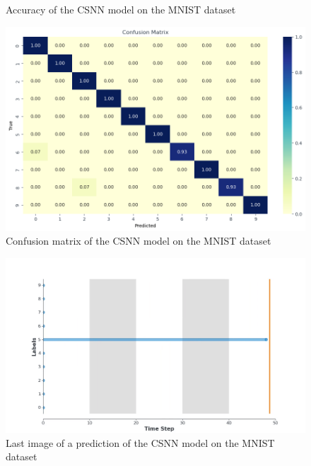 \documentclass[11pt]{article}
\begin{document}
\begin{figure}[H]
\begin{minipage}{0.5\textwidth}
\begin{center}
      \caption{Accuracy of the CSNN model on the MNIST dataset}
      \label{fig:accuracy_MNIST}
    \end{center}
  \end{minipage}
\end{figure}

\begin{figure}[H]
  \begin{center}
    \includegraphics[width=\textwidth]{image/confusion_mat_MNIST.png}
    \caption{Confusion matrix of the CSNN model on the MNIST dataset}
    \label{fig:confusion_matrix_MNIST}
  \end{center}
\end{figure}


\begin{figure}[H]
  \begin{center}
    \includegraphics[width=\textwidth]{image/mnist2_050.png}
    \caption{Last image of a prediction of the CSNN model on the MNIST dataset}
    \label{fig:mnist2}
  \end{center}
\end{figure}
\end{document}
